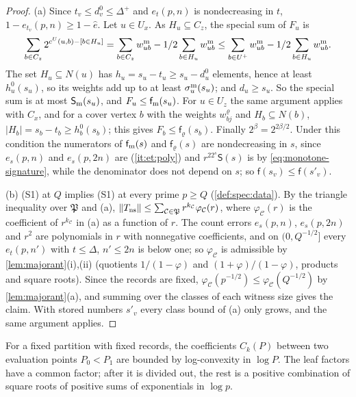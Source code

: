 \begin{proof}
(a) Since $t_v\le d^0_v\le\Delta^+$ and $e_t(p,n)$ is nondecreasing in $t$,
$1-e_{t_v}(p,n)\ge1-\hat e$. Let $u\in U_x$. As $H_u\subseteq C_z$, the special sum
of $F_u$ is
\[
 \sum_{b\in C_z}2^{c^U(u,b)-[b\in H_u]}
 =\sum_{b\in C_z}w^{\rm m}_{ub}-\frac12\sum_{b\in H_u}w^{\rm m}_{ub}
 \le\sum_{b\in U^+}w^{\rm m}_{ub}-\frac12\sum_{b\in H_u}w^{\rm m}_{ub}.
\]
The set $H_u\subseteq N(u)$ has $h_u=s_u-t_u\ge s_u-d^0_u$ elements, hence at least
$h^0_u(s_u)$, so its weights add up to at least $\sigma^{\rm m}_u(s_u)$; and
$d_u\ge s_u$. So the special sum is at most $\mathsf S_{\rm m}(s_u)$, and
$F_u\le\mathsf f_{\rm m}(s_u)$. For $u\in U_z$ the same argument applies with $C_x$,
and for a cover vertex $b$ with the weights $w^\varrho_{bj}$ and $H_b\subseteq N(b)$,
$|H_b|=s_b-t_b\ge h^0_b(s_b)$; this gives $F_b\le\mathsf f_\varrho(s_b)$. Finally
$2^\beta=2^{2\beta/2}$. Under this condition the numerators of $\mathsf f_{\rm m}(s)$ and
$\mathsf f_\varrho(s)$ are nondecreasing in $s$, since $e_s(p,n)$ and $e_s(p,2n)$ are
(\ref{it:et:poly}) and $r^22^s\mathsf S(s)$ is by \eqref{eq:monotone-signature}, while
the denominator does not depend on $s$; so $\mathsf f(s_v)\le\mathsf f(s'_v)$.

(b) (S1) at $Q$ implies (S1) at every prime $p\ge Q$ (\cref{def:spec:data}). By the
triangle inequality over $\mathfrak P$ and (a), $\norm{T_{\rm ns}}\le\sum_{\mathcal
C\in\mathfrak P}r^{k_{\mathcal C}}\varphi_{\mathcal C}(r)$, where
$\varphi_{\mathcal C}(r)$ is the coefficient of $r^{k_{\mathcal C}}$ in (a) as a
function of $r$. The count errors $e_s(p,n)$, $e_s(p,2n)$ and $r^2$ are polynomials
in $r$ with nonnegative coefficients, and on $(0,Q^{-1/2}]$ every $e_t(p,n')$ with
$t\le\Delta$, $n'\le2n$ is below one; so $\varphi_{\mathcal C}$ is admissible by
\cref{lem:majorant}(i),(ii) (quotients $1/(1-\varphi)$ and
$(1+\varphi)/(1-\varphi)$, products and square roots). Since the records are fixed,
$\varphi_{\mathcal C}(p^{-1/2})\le\varphi_{\mathcal C}(Q^{-1/2})$ by
\cref{lem:majorant}(a), and summing over the classes of each witness size gives
the claim. With stored numbers $s'_v$ every class bound of (a) only grows, and the
same argument applies.
\end{proof}

For a fixed partition with fixed records, the coefficients $C_k(P)$ between
two evaluation points $P_0<P_1$ are bounded by log-convexity in $\log P$. The leaf factors have a common factor;
after it is divided out, the rest is a positive combination of square roots of
positive sums of exponentials in $\log p$.

